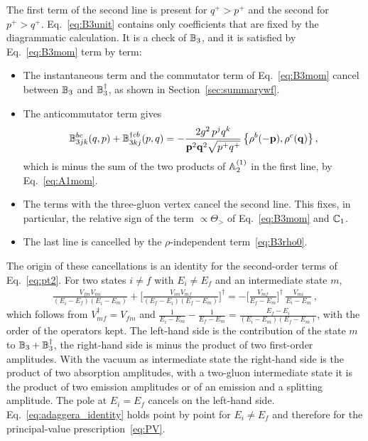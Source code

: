 The first term of the second line is present for $q^+>p^+$ and the second for $p^+>q^+$. Eq.~\eqref{eq:B3unit} contains only coefficients that are fixed by the diagrammatic calculation. It is a check of $\mathbb{B}_3$, and it is satisfied by Eq.~\eqref{eq:B3mom} term by term:
\begin{itemize}
\item The instantaneous term and the commutator term of Eq.~\eqref{eq:B3mom} cancel between $\mathbb{B}_3$ and $\mathbb{B}_3^\dagger$, as shown in Section~\ref{sec:summarywf}.
\item The anticommutator term gives
\begin{align}
\mathbb{B}^{bc}_{3jk}(q,p)+\mathbb{B}^{\dagger cb}_{3kj}(p,q)=-\frac{2g^2\,p^jq^k}{\mathbf{p}^2\mathbf{q}^2\sqrt{p^+q^+}}\,\big\{\rho^b(-\mathbf{p}),\rho^c(\mathbf{q})\big\}\,,
\end{align}
which is minus the sum of the two products of $\mathbb{A}^{(1)}_2$ in the first line, by Eq.~\eqref{eq:A1mom}.
\item The terms with the three-gluon vertex cancel the second line. This fixes, in particular, the relative sign of the term $\propto\Theta_>$ of Eq.~\eqref{eq:B3mom} and $\mathbb{C}_1$.
\item The last line is cancelled by the $\rho$-independent term~\eqref{eq:B3rho0}.
\end{itemize}
The origin of these cancellations is an identity for the second-order terms of Eq.~\eqref{eq:pt2}. For two states $i\neq f$ with $E_i\neq E_f$ and an intermediate state $m$,
\begin{align}\label{eq:adaggera_identity}
\frac{V_{fm}V_{mi}}{(E_i-E_f)(E_i-E_m)}+\Big[\frac{V_{im}V_{mf}}{(E_f-E_i)(E_f-E_m)}\Big]^\dagger=-\Big[\frac{V_{mf}}{E_f-E_m}\Big]^\dagger\,\frac{V_{mi}}{E_i-E_m}\,,
\end{align}
which follows from $V_{mf}^\dagger=V_{fm}$ and $\frac{1}{E_i-E_m}-\frac{1}{E_f-E_m}=\frac{E_f-E_i}{(E_i-E_m)(E_f-E_m)}$, with the order of the operators kept. The left-hand side is the contribution of the state $m$ to $\mathbb{B}_3+\mathbb{B}_3^\dagger$, the right-hand side is minus the product of two first-order amplitudes. With the vacuum as intermediate state the right-hand side is the product of two absorption amplitudes, with a two-gluon intermediate state it is the product of two emission amplitudes or of an emission and a splitting amplitude. The pole at $E_i=E_f$ cancels on the left-hand side. Eq.~\eqref{eq:adaggera_identity} holds point by point for $E_i\neq E_f$ and therefore for the principal-value prescription~\eqref{eq:PV}.

